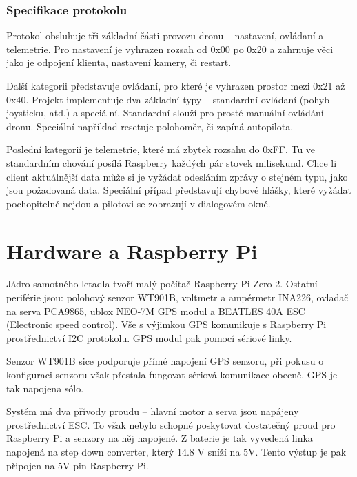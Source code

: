 \documentclass[a4paper,oneside,12pt]{report}
\begin{document}
\subsection{Specifikace protokolu}

Protokol obsluhuje tři základní části provozu dronu -- nastavení, ovládaní a telemetrie.
Pro nastavení je vyhrazen rozsah od 0x00 po 0x20 a zahrnuje věci jako je odpojení klienta, nastavení kamery, či restart.

Další kategorii představuje ovládaní, pro které je vyhrazen prostor mezi 0x21 až 0x40.
Projekt implementuje dva základní typy -- standardní ovládaní (pohyb joysticku, atd.) a speciální.
Standardní slouží pro prosté manuální ovládání dronu.
Speciální například resetuje polohoměr, či zapíná autopilota.

Poslední kategorií je telemetrie, které má zbytek rozsahu do 0xFF.
Tu ve standardním chování posílá Raspberry každých pár stovek milisekund.
Chce li client aktuálnější data může si je vyžádat odesláním zprávy o stejném typu, jako jsou požadovaná data.
Speciální případ představují chybové hlášky, které vyžádat pochopitelně nejdou a pilotovi se zobrazují v dialogovém okně.

\chapter{Hardware a Raspberry Pi}

Jádro samotného letadla tvoří malý počítač Raspberry Pi Zero 2.
Ostatní periférie jsou: polohový senzor WT901B, voltmetr a ampérmetr INA226, ovladač na serva PCA9865, ublox NEO-7M GPS modul a BEATLES 40A ESC (Electronic speed control).
Vše s výjimkou GPS komunikuje s Raspberry Pi prostřednictví I2C protokolu.
GPS modul pak pomocí sériové linky.

Senzor WT901B sice podporuje přímé napojení GPS senzoru, při pokusu o konfiguraci senzoru však přestala fungovat sériová komunikace obecně.
GPS je tak napojena sólo.

Systém má dva přívody proudu -- hlavní motor a serva jsou napájeny prostřednictví ESC.
To však nebylo schopné poskytovat dostatečný proud pro Raspberry Pi a senzory na něj napojené.
Z baterie je tak vyvedená linka napojená na step down converter, který 14.8 V sníží na 5V.
Tento výstup je pak připojen na 5V pin Raspberry Pi.
\end{document}
